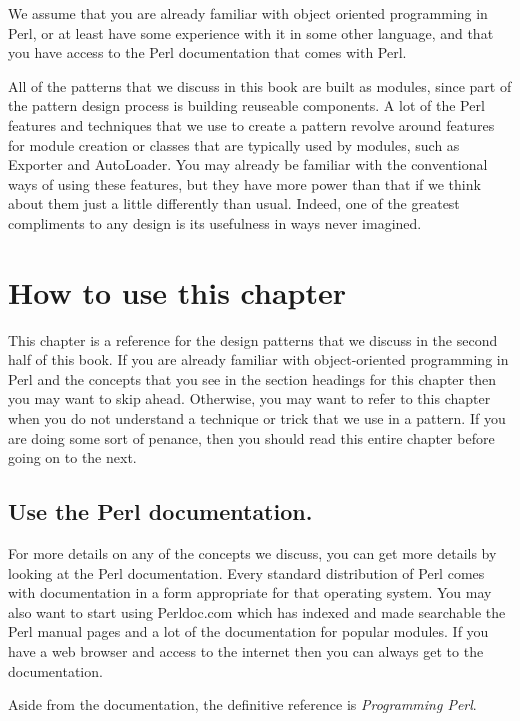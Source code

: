 
We assume that you are already familiar with object oriented 
programming in Perl, or at least have some experience with it
in some other language, and that you have access to the Perl
documentation that comes with Perl.

All of the patterns that we discuss in this book are built
as modules, since part of the pattern design process is 
building reuseable components.  A lot of the Perl features
and techniques that we use to create a pattern revolve
around features for module creation or classes that are
typically used by modules, such as Exporter and AutoLoader.
You may already be familiar with the conventional ways of
using these features, but they have more power than that
if we think about them just a little differently than usual.
Indeed, one of the greatest compliments to any design is its
usefulness in ways never imagined.

    \section{How to use this chapter}

This chapter is a reference for the design patterns that we
discuss in the second half of this book.  If you are already 
familiar with object-oriented programming in Perl and the concepts
that you see in the section headings for this chapter then you
may want to skip ahead.  Otherwise, you may want to refer to this
chapter when you do not understand a technique or trick that we
use in a pattern.  If you are doing some sort of penance, then
you should read this entire chapter before going on to the next.

        \subsection{Use the Perl documentation.}

For more details on any of the concepts we discuss, you can get
more details by looking at the Perl documentation.  Every standard distribution
of Perl comes with documentation in a form appropriate for that
operating system.  You may also want to start using Perldoc.com which
has indexed and made searchable the Perl manual pages and a lot of the
documentation for popular modules.  If you have a web browser and access
to the internet then you can always get to the documentation.

Aside from the documentation, the definitive reference is {\it Programming Perl}.

